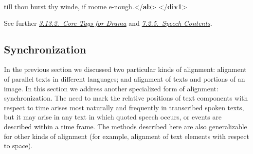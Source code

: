 \begin{shaded}
\hspace*{1em}\hspace*{1em}\hspace*{1em}\hspace*{1em}\hspace*{1em}\hspace*{1em} till thou burst thy winde, if roome e-nough.{</\textbf{ab}>}\mbox{}\newline 
\hspace*{1em}\mbox{}\newline 
{}\mbox{}\newline 
{</\textbf{div1}>}\end{shaded}\egroup\par \noindent  See further \textit{\hyperref[CODR]{3.13.2.\ Core Tags for Drama}} and \textit{\hyperref[DRPAL]{7.2.5.\ Speech Contents}}.
\subsection[{Synchronization}]{Synchronization}\label{SASY}\par
In the previous section we discussed two particular kinds of alignment: alignment of parallel texts in different languages; and alignment of texts and portions of an image. In this section we address another specialized form of alignment: synchronization. The need to mark the relative positions of text components with respect to time arises most naturally and frequently in transcribed spoken texts, but it may arise in any text in which quoted speech occurs, or events are described within a time frame. The methods described here are also generalizable for other kinds of alignment (for example, alignment of text elements with respect to space).
